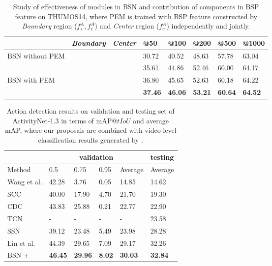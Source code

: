 \documentclass[runningheads]{llncs}
\begin{document}
\begin{table}[tbp]
\setlength{\abovecaptionskip}{0.1cm} %
\small
\centering
\caption{ Study of effectiveness of modules in BSN and  contribution of components in BSP feature on THUMOS14, where PEM is trained with BSP feature constructed by   \emph{Boundary} region ($f_s^A,f_e^A$) and   \emph{Center} region ($f_c^A$) independently and jointly.}
\begin{tabular}{p{2.7cm}p{1.3cm}<{\centering}p{1.3cm}<{\centering}p{1.2cm}<{\centering}p{1.2cm}<{\centering} p{1.2cm}<{\centering}p{1.2cm}<{\centering}p{1.2cm}<{\centering}}
\toprule
					& \emph{Boundary} 	& \emph{Center} 	& @50	& @100 	& @200	& @500	& @1000 \\
 \hline
 BSN without PEM 	&			&			& 30.72	& 40.52 	& 48.63	& 57.78	& 63.04\\
 \hline
 					&\Checkmark 	& 			& 35.61	& 44.86	& 52.46	& 60.00	& 64.17\\
 BSN with PEM 		&  			&\Checkmark	& 36.80	& 45.65	& 52.63	& 60.18	& 64.22\\
 					&\Checkmark	&\Checkmark	& {\bf 37.46}	& {\bf 46.06	}& {\bf 53.21}	& {\bf 60.64}	& {\bf 64.52}\\
\bottomrule
\end{tabular}
\label{table_post}
\vspace{-0.6cm}
\end{table}


\begin{table}[tbp]
\setlength{\abovecaptionskip}{0.1cm} %
\centering
\caption{Action detection results on validation and testing set of ActivityNet-1.3 in terms of mAP@$tIoU$ and average mAP, where our proposals are combined with video-level classification results generated by \cite{zhao2017cuhk}.  }
\small
\begin{tabular}{p{2.8cm}p{1.4cm}<{\centering}p{1.4cm}<{\centering}p{1.4cm}<{\centering}p{1.5cm}<{\centering}p{1.6cm}<{\centering}}
\toprule
 & \multicolumn{4}{c}{validation} & testing  \\
\hline
Method  & 0.5  &  0.75  & 0.95  & Average  & Average  \\
\hline
Wang et al. \cite{wang2016uts}    & 42.28 & 3.76  & 0.05   & 14.85 & 14.62 \\
SCC \cite{heilbron2017scc}   & 40.00 & 17.90  & 4.70   & 21.70 & 19.30 \\
CDC \cite{shou2017cdc}    & 43.83  & 25.88  & 0.21   & 22.77  & 22.90 \\
TCN \cite{dai2017temporal} & - & - & - & - & 23.58\\
SSN \cite{xiong2017pursuit}    & 39.12 & 23.48  & 5.49  & 23.98 & 28.28 \\
Lin et al. \cite{lin2017temporal} & 44.39   & 29.65  & 7.09  & 29.17 & 32.26 \\
\hline
BSN + \cite{zhao2017cuhk} & {\bf 46.45 }   & {\bf 29.96}  & {\bf 8.02}  & {\bf 30.03 } & {\bf 32.84 } \\
\bottomrule
\end{tabular}
\label{table_detection_anet}
\normalsize
\vspace{-0.1cm}
\end{table}
\end{document}
